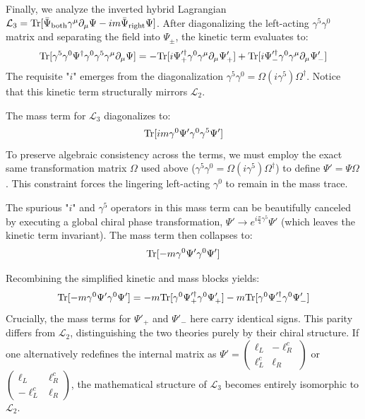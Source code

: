 Finally, we analyze the inverted hybrid Lagrangian $\mathcal{L}_3={\rm Tr}[ \bar\Psi_{\text{both}}\gamma^\mu\partial_\mu\Psi-im\bar\Psi_{\text{right}}\Psi]$. After diagonalizing the left-acting $\gamma^5\gamma^0$ matrix and separating the field into $\Psi_\pm$, the kinetic term evaluates to:
\begin{equation}
\begin{aligned}
    {\rm Tr}[ \gamma^5\gamma^0\Psi^\dagger\gamma^0\gamma^5\gamma^\mu\partial_\mu\Psi]=-{\rm Tr}[ i\Psi_+'^\dagger\gamma^0\gamma^\mu\partial_\mu\Psi_+']+{\rm Tr}[ i\Psi_-'^\dagger\gamma^0\gamma^\mu\partial_\mu\Psi_-']
\end{aligned}
\end{equation}
The requisite "$i$" emerges from the diagonalization $\gamma^5\gamma^0=\Omega(i\gamma^5)\Omega^\dagger$. Notice that this kinetic term structurally mirrors $\mathcal{L}_2$.

The mass term for $\mathcal{L}_3$ diagonalizes to: 
\begin{equation}
    {\rm Tr}[im\gamma^0\Psi'\gamma^0\gamma^5\Psi']
\end{equation}
To preserve algebraic consistency across the terms, we must employ the exact same transformation matrix $\Omega$ used above ($\gamma^5\gamma^0=\Omega(i\gamma^5)\Omega^\dagger$) to define $\Psi'=\Psi\Omega$. This constraint forces the lingering left-acting $\gamma^0$ to remain in the mass trace. 

The spurious "$i$" and $\gamma^5$ operators in this mass term can be beautifully canceled by executing a global chiral phase transformation, $\Psi'\to e^{i\frac{\pi}{4}\gamma^5}\Psi'$ (which leaves the kinetic term invariant). The mass term then collapses to: 
\begin{equation}
    {\rm Tr}[-m\gamma^0\Psi'\gamma^0\Psi']
\end{equation}

Recombining the simplified kinetic and mass blocks yields: 
\begin{equation}
    {\rm Tr}[-m\gamma^0\Psi'\gamma^0\Psi']=-m{\rm Tr}[\gamma^0\Psi_+'^\dagger\gamma^0\Psi_+']-m{\rm Tr}[\gamma^0\Psi_-'^\dagger\gamma^0\Psi_-']
\end{equation}
Crucially, the mass terms for $\Psi'_+$ and $\Psi'_-$ here carry identical signs. This parity differs from $\mathcal{L}_2$, distinguishing the two theories purely by their chiral structure. If one alternatively redefines the internal matrix as $\Psi'=\begin{pmatrix} \ell_L&-\ell_R^c\\ \ell_L^c & \ell_R\end{pmatrix}$ or $\begin{pmatrix} \ell_L&\ell_R^c\\ -\ell_L^c & \ell_R\end{pmatrix}$, the mathematical structure of $\mathcal{L}_3$ becomes entirely isomorphic to $\mathcal{L}_2$.

